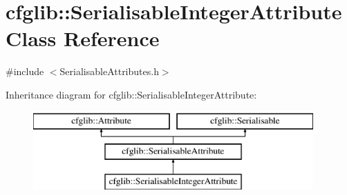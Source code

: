 \hypertarget{classcfglib_1_1SerialisableIntegerAttribute}{}\section{cfglib\+:\+:Serialisable\+Integer\+Attribute Class Reference}
\label{classcfglib_1_1SerialisableIntegerAttribute}


{\ttfamily \#include $<$Serialisable\+Attributes.\+h$>$}

Inheritance diagram for cfglib\+:\+:Serialisable\+Integer\+Attribute\+:\begin{figure}[H]
\begin{center}
\leavevmode
\includegraphics[height=3.000000cm]{classcfglib_1_1SerialisableIntegerAttribute}
\end{center}
\end{figure}
